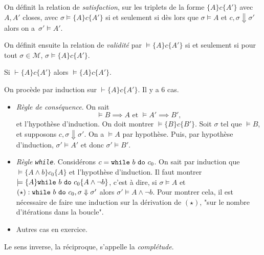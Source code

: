 \documentclass[../main]{subfiles}
\begin{document}
  \begin{defn}
    On définit la relation de \textit{satisfaction}, sur les triplets de la forme $\{A\} c \{A'\}$ avec $A,A'$ closes, avec
    $\sigma \models \{A\}c \{A'\}$ si et seulement si dès lors que $\sigma \models A$ et $c, \sigma \Downarrow \sigma'$ alors on a~$\sigma' \models A'$. 

    On définit ensuite la relation de \textit{validité} par $\models \{A\} c \{A'\}$ si et seulement si pour tout $\sigma \in \mathcal{M}$, $\sigma \models \{A\}c \{A'\}$.
  \end{defn}

  \begin{thm}
    Si $\vdash \{A\} c \{A'\}$ alors $\models \{A\} c \{A'\}$.
  \end{thm}
  \begin{prv}
    On procède par induction sur $\vdash \{A\} c \{A'\}$. Il y a 6 cas.
    \begin{itemize}
      \item \textsl{Règle de conséquence}.
        On sait \[
        \models B \implies A \text{ et }\models A' \implies B'
        ,\]et l'hypothèse d'induction.
        On doit montrer $\models \{B\}c \{B'\}$.
        Soit $\sigma$ tel que $\models B$, et supposons $c, \sigma \Downarrow \sigma'$.
        On a $\models A$ par hypothèse.
        Puis, par hypothèse d'induction, $\sigma' \models A'$ et donc $\sigma' \models B'$.
      \item \textsl{Règle \texttt{while}}.
        Considérons $c = \texttt{while}\ b\ \texttt{do}\ c_0$.
        On sait par induction que $\models \{A \land b\}c_0 \{A\}$ et l'hypothèse d'induction.
        Il faut montrer $\models \{A\} \texttt{while}\ b\ \texttt{do}\ c_0 \{A \land \lnot b\}$, c'est à dire, si $\sigma \models A$ et $(\star) : \texttt{while}\ b\ \texttt{do}\ c_0, \sigma \Downarrow \sigma'$ alors $\sigma' \models A \land \lnot b$.
        Pour montrer cela, il est nécessaire de faire une induction sur la dérivation de $(\star)$, "sur le nombre d'itérations dans la boucle".
      \item Autres cas en exercice.
    \end{itemize}
  \end{prv}


  Le sens inverse, la réciproque, s'appelle la \textit{complétude}.
\end{document}
